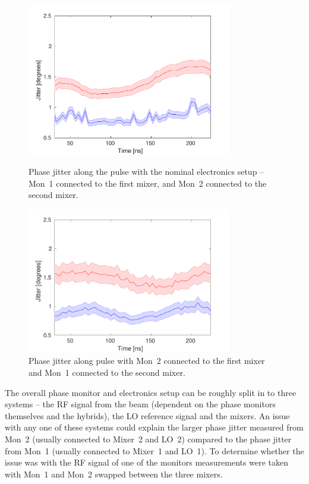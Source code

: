 \begin{figure}
  \centering
  \includegraphics[width=0.8\textwidth]{Figures/phaseMons/Mix1Mon1_Mix2Mon2}
  \caption{Phase jitter along the pulse with the nominal electronics setup -- Mon~1 connected to the first mixer, and Mon~2 connected to the second mixer.}
  \label{f:Mix1Mon1_Mix2Mon2}
  \includegraphics[width=0.8\textwidth]{Figures/phaseMons/Mix1Mon2_Mix2Mon1}
  \caption{Phase jitter along pulse with Mon~2 connected to the first mixer and Mon~1 connected to the second mixer.}
  \label{f:Mix1Mon2_Mix2Mon1}
\end{figure}

The overall phase monitor and electronics setup can be roughly split in to three systems -- the RF signal from the beam (dependent on the phase monitors themselves and the hybrids), the LO reference signal and the mixers. An issue with any one of these systems could explain the larger phase jitter measured from Mon~2 (usually connected to Mixer~2 and LO~2) compared to the phase jitter from Mon~1 (usually connected to Mixer~1 and LO~1). To determine whether the issue was with the RF signal of one of the monitors measurements were taken with Mon~1 and Mon~2 swapped between the three mixers.

